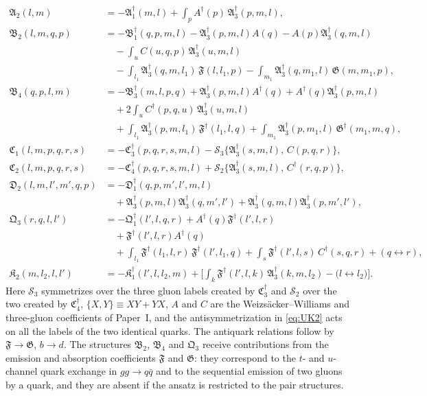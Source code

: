 \documentclass[11pt,a4paper]{article}
\numberwithin{equation}{section}
\newcommand{\mf}[1]{\mathfrak{#1}}
\newcommand{\dg}{\dagger}
\begin{document}
\begin{align}
\mf A_{2}(l,m)&=-\mf A_{1}^{\dg}(m,l)+\int_{p}A^{\dg}(p)\,\mf A_{3}^{\dg}(p,m,l),
\label{eq:UA2}\\[3pt]
\mf B_{2}(l,m,q,p)&=-\mf B_{1}^{\dg}(q,p,m,l)-\mf A_{3}^{\dg}(p,m,l)A(q)-A(p)\mf A_{3}^{\dg}(q,m,l)
\nonumber\\
&\quad-\int_{u}C(u,q,p)\,\mf A_{3}^{\dg}(u,m,l)
\nonumber\\
&\quad-\int_{l_{1}}\mf A_{3}^{\dg}(q,m,l_{1})\,\mf F(l,l_{1},p)
-\int_{m_{1}}\mf A_{3}^{\dg}(q,m_{1},l)\,\mf G(m,m_{1},p),
\label{eq:UB2}\\[3pt]
\mf B_{4}(q,p,l,m)&=-\mf B_{3}^{\dg}(m,l,p,q)+\mf A_{3}^{\dg}(p,m,l)A^{\dg}(q)+A^{\dg}(q)\mf A_{3}^{\dg}(p,m,l)
\nonumber\\
&\quad+2\int_{u}C^{\dg}(p,q,u)\,\mf A_{3}^{\dg}(u,m,l)
\nonumber\\
&\quad+\int_{l_{1}}\mf A_{3}^{\dg}(p,m,l_{1})\,\mf F^{\dg}(l_{1},l,q)
+\int_{m_{1}}\mf A_{3}^{\dg}(p,m_{1},l)\,\mf G^{\dg}(m_{1},m,q),
\label{eq:UB4}\\[3pt]
\mf C_{1}(l,m,p,q,r,s)&=-\mf C_{3}^{\dg}(p,q,r,s,m,l)
-\mathcal S_{3}\Big\{\mf A_{3}^{\dg}(s,m,l),\,C(p,q,r)\Big\},
\label{eq:UC1}\\[3pt]
\mf C_{2}(l,m,p,q,r,s)&=-\mf C_{4}^{\dg}(p,q,r,s,m,l)
+\mathcal S_{2}\Big\{\mf A_{3}^{\dg}(s,m,l),\,C^{\dg}(r,q,p)\Big\},
\label{eq:UC2}\\[3pt]
\mf D_{2}(l,m,l',m',q,p)&=-\mf D_{1}^{\dg}(q,p,m',l',m,l)
\nonumber\\&\quad
+\mf A_{3}^{\dg}(p,m,l)\mf A_{3}^{\dg}(q,m',l')+\mf A_{3}^{\dg}(q,m,l)\mf A_{3}^{\dg}(p,m',l'),
\label{eq:UD2}\\[3pt]
\mf Q_{3}(r,q,l,l')&=-\mf Q_{1}^{\dg}(l',l,q,r)+A^{\dg}(q)\mf F^{\dg}(l',l,r)
\nonumber\\
&\quad+\mf F^{\dg}(l',l,r)A^{\dg}(q)
\nonumber\\
&\quad+\int_{l_{1}}\mf F^{\dg}(l_{1},l,r)\,\mf F^{\dg}(l',l_{1},q)
+\int_{s}\mf F^{\dg}(l',l,s)\,C^{\dg}(s,q,r)+(q\leftrightarrow r),
\label{eq:UQ3}\\[3pt]
\mf K_{2}(m,l_{2},l,l')&=-\mf K_{1}^{\dg}(l',l,l_{2},m)
+\Big[\int_{k}\mf F^{\dg}(l',l,k)\,\mf A_{3}^{\dg}(k,m,l_{2})-\big(l\leftrightarrow l_{2}\big)\Big].
\label{eq:UK2}
\end{align}
Here $\mathcal S_{3}$ symmetrizes over the three gluon labels created by $\mf C_{3}^{\dg}$ and
$\mathcal S_{2}$ over the two created by $\mf C_{4}^{\dg}$, $\{X,Y\}\equiv XY+YX$, $A$ and $C$ are the
Weizs\"acker--Williams and three-gluon coefficients of Paper~I, and the antisymmetrization in
\eqref{eq:UK2} acts on all the labels of the two identical quarks. The antiquark relations follow
by $\mf F\to\mf G$, $b\to d$. The structures $\mf B_{2}$, $\mf B_{4}$ and $\mf Q_{3}$ receive
contributions from the emission and absorption coefficients $\mf F$ and $\mf G$: they correspond to
the $t$- and $u$-channel quark exchange in $gg\to q\bar q$ and to the sequential emission of two
gluons by a quark, and they are absent if the ansatz is restricted to the pair structures.
\end{document}
